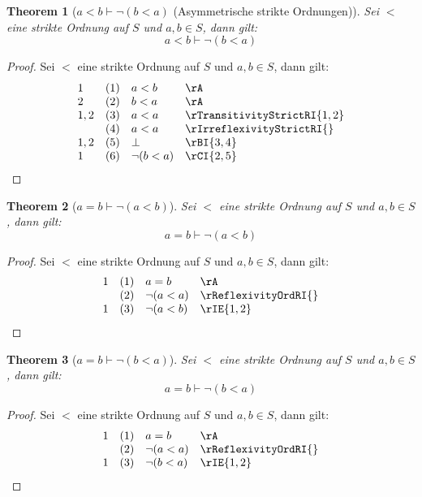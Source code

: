 \documentclass{book}
\theoremstyle{plain}
\newtheorem{theorem}{Theorem}
\theoremstyle{remark}
\theoremstyle{definition}
\begin{document}
\label{aLneqbImpnLpbLneqaRp}
\begin{theorem}[\(a<b\vdash \neg(b<a)\) (Asymmetrische strikte Ordnungen)]
Sei \(<\) eine strikte Ordnung auf \(S\) und \(a,b\in  S\), dann gilt:
\[a<b\vdash \neg(b<a)\]
\end{theorem}
\begin{proof}
    Sei \(<\) eine strikte Ordnung auf \(S\) und \(a,b\in  S\), dann gilt:
	\[
	\begin{array}{llll}
		1   & (1) & a<b & \rA\\
        2   & (2) & b<a & \rA\\
		1,2 & (3) & a<a & \rTransitivityStrictRI{1,2}\\
            & (4) & a<a & \rIrreflexivityStrictRI{}\\
        1,2 & (5) & \bot & \rBI{3,4}\\
        1   & (6) & \neg(b<a) & \rCI{2,5}\\
	\end{array}
	\]
\end{proof}

\label{aEqualsbImpnLpaLneqbRp}
\begin{theorem}[\(a=b\vdash \neg(a<b)\)]
Sei \(<\) eine strikte Ordnung auf \(S\) und \(a,b\in  S\), dann gilt:
\[a=b\vdash \neg(a<b)\]
\end{theorem}
\begin{proof}
    Sei \(<\) eine strikte Ordnung auf \(S\) und \(a,b\in  S\), dann gilt:
	\[
	\begin{array}{llll}
		1   & (1) & a=b & \rA\\
            & (2) & \neg(a<a) & \rReflexivityOrdRI{}\\
		1   & (3) & \neg(a<b) & \rIE{1,2}\\
	\end{array}
	\]
\end{proof}

\label{aEqualsbImpnLpbLneqaRp}
\begin{theorem}[\(a=b\vdash \neg(b<a)\)]
Sei \(<\) eine strikte Ordnung auf \(S\) und \(a,b\in  S\), dann gilt:
\[a=b\vdash \neg(b<a)\]
\end{theorem}
\begin{proof}
    Sei \(<\) eine strikte Ordnung auf \(S\) und \(a,b\in  S\), dann gilt:
	\[
	\begin{array}{llll}
		1   & (1) & a=b & \rA\\
            & (2) & \neg(a<a) & \rReflexivityOrdRI{}\\
		1   & (3) & \neg(b<a) & \rIE{1,2}\\
	\end{array}
	\]
\end{proof}
\end{document}
